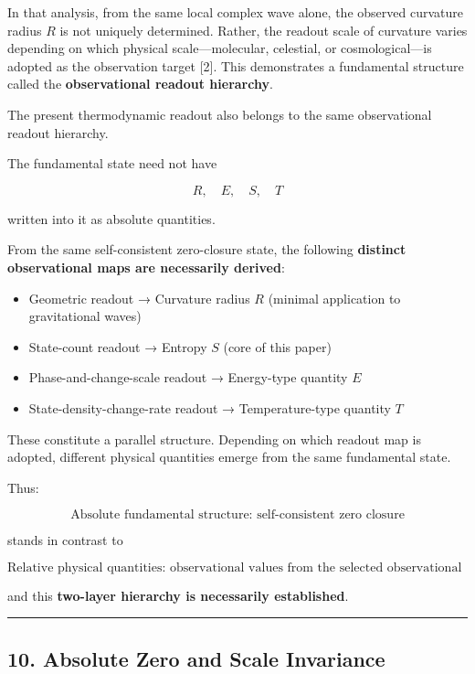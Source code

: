 \documentclass[
  a4paper,
]{article}
\providecommand{\tightlist}{%
  \setlength{\itemsep}{0pt}\setlength{\parskip}{0pt}}
\begin{document}
In that analysis, from the same local complex wave alone, the observed
curvature radius \(R\) is not uniquely determined. Rather, the readout
scale of curvature varies depending on which physical scale---molecular,
celestial, or cosmological---is adopted as the observation target
{[}2{]}. This demonstrates a fundamental structure called the
\textbf{observational readout hierarchy}.

The present thermodynamic readout also belongs to the same observational
readout hierarchy.

The fundamental state need not have

\[
R,\quad E,\quad S,\quad T
\]

written into it as absolute quantities.

From the same self-consistent zero-closure state, the following
\textbf{distinct observational maps are necessarily derived}:

\begin{itemize}
\tightlist
\item
  Geometric readout → Curvature radius \(R\) (minimal application to
  gravitational waves)
\item
  State-count readout → Entropy \(S\) (core of this paper)
\item
  Phase-and-change-scale readout → Energy-type quantity \(E\)
\item
  State-density-change-rate readout → Temperature-type quantity \(T\)
\end{itemize}

These constitute a parallel structure. Depending on which readout map is
adopted, different physical quantities emerge from the same fundamental
state.

Thus:

\[
\boxed{
\text{Absolute fundamental structure: self-consistent zero closure}
}
\]

stands in contrast to

\[
\boxed{
\text{Relative physical quantities: observational values from the selected observational readout hierarchy}
}
\]

and this \textbf{two-layer hierarchy is necessarily established}.

\begin{center}\rule{0.5\linewidth}{0.5pt}\end{center}

\subsection{10. Absolute Zero and Scale
Invariance}\label{absolute-zero-and-scale-invariance}
\end{document}
